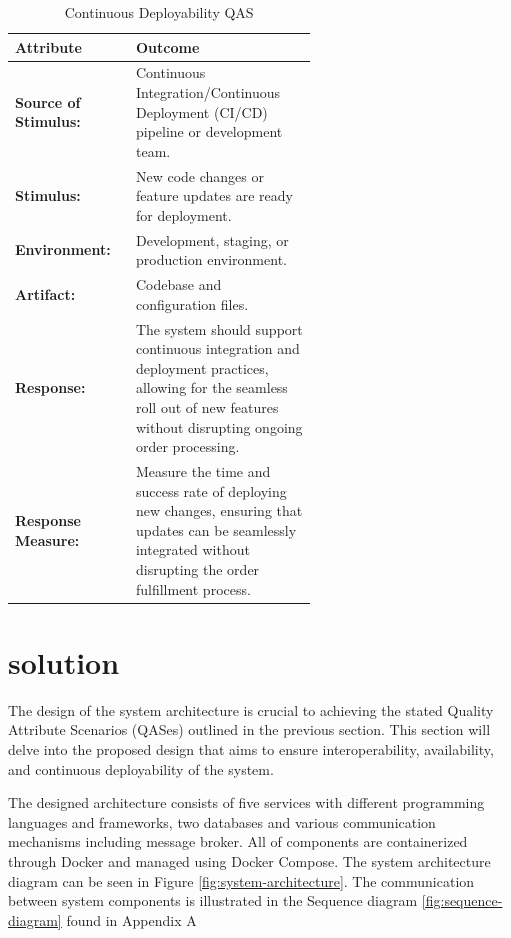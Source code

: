 \documentclass[conference]{IEEEtran}
\begin{document}
\begin{table}[H]
    \centering
    \begin{tabular}{|l|p{0.6\linewidth}|}
        \hline
        \textbf{Attribute} & \textbf{Outcome} \\
        \hline
        \textbf{Source of Stimulus:} & Continuous Integration/Continuous Deployment (CI/CD) pipeline or development team. \\
        \hline
        \textbf{Stimulus:} & New code changes or feature updates are ready for deployment. \\
        \hline
        \textbf{Environment:} & Development, staging, or production environment. \\
        \hline
        \textbf{Artifact:} & Codebase and configuration files. \\
        \hline
        \textbf{Response:} & The system should support continuous integration and deployment practices, allowing for the seamless roll out of new features without disrupting ongoing order processing. \\
        \hline
        \textbf{Response Measure:} & Measure the time and success rate of deploying new changes, ensuring that updates can be seamlessly integrated without disrupting the order fulfillment process. \\
        \hline
    \end{tabular}
    \caption{Continuous Deployability QAS}
\end{table}


\section{solution}
\label{sec:middleware_architecture}
The design of the system architecture is crucial to achieving the stated Quality Attribute Scenarios (QASes) outlined in the previous section. This section will delve into the proposed design that aims to ensure interoperability, availability, and continuous deployability of the system.

The designed architecture consists of five services with different programming languages and frameworks, two databases and various communication mechanisms including message broker. All of components are containerized through Docker and managed using Docker Compose. The system architecture diagram can be seen in Figure \ref{fig:system-architecture}. The communication between system components is illustrated in the Sequence diagram \ref{fig:sequence-diagram} found in Appendix A
\end{document}
